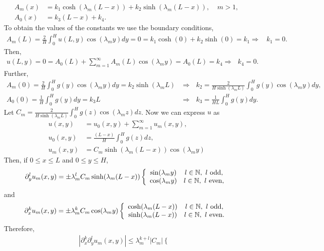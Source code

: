 \begin{questions}
\begin{solution}
\begin{align*}
A_m(x)&=k_1\cosh(\lambda_m(L-x))+k_2\sinh(\lambda_m(L-x)),~~~~~m>1,\\
A_0(x)&=k_3(L-x)+k_4.
\end{align*}
To obtain the values of the constants we use the boundary conditions,
\begin{align*}
A_m(L)=\frac{2}{H}\int_0^Hu(L,y)\cos(\lambda_my)dy=0=k_1\cosh(0)+k_2\sinh(0)=k_1\Rightarrow~~~~\boxed{k_1=0}.
\end{align*}
Then,
\begin{align*}
u(L,y)=0=A_0(L)+\sum_{m=1}^{\infty}A_m(L)\cos(\lambda_my)=A_0(L)=k_4\Rightarrow~~~\boxed{k_4=0}.
\end{align*}
Further,
\begin{align*}
A_m(0)=\frac{2}{H}\int_0^Hg(y)\cos(\lambda_my)dy=k_2\sinh(\lambda_mL)&\Rightarrow~~~\boxed{k_2=\frac{2}{H\sinh(\lambda_mL)}\int_0^Hg(y)\cos(\lambda_my)dy},\\
A_0(0)=\frac{1}{H}\int_0^Hg(y)dy=k_3L&\Rightarrow~~~\boxed{k_3=\frac{1}{HL}\int_0^Hg(y)dy}.
\end{align*}
Let $C_m=\frac{2}{H\sinh(\lambda_mL)}\int_0^Hg(z)\cos(\lambda_mz)dz$. Now we can express $u$ as
\begin{align*}
u(x,y)&=u_0(x,y)+\sum_{m=1}^{\infty}u_m(x,y),\\
u_0(x,y)&=\frac{(L-x)}{H}\int_0^Hg(z)dz,\\
u_m(x,y)&=C_m\sinh(\lambda_m(L-x))\cos(\lambda_my)
\end{align*}
Then, if $0\leq x\leq L$ and $0\leq y\leq H$,
\begin{align*}
\partial_y^lu_m(x,y)=\pm\lambda_m^lC_m\sinh(\lambda_m(L-x))\left\{ \begin{array}{cc} 
                \sin(\lambda_my) & l\in\mathbb{N},~l~\text{odd}, \\
                \cos(\lambda_my) & l\in\mathbb{N},~l~\text{even},
                \end{array} \right.
\end{align*}
and
\begin{align*}
\partial_x^ku_m(x,y)=\pm\lambda_m^kC_m\cos(\lambda_my)\left\{ \begin{array}{cc} 
                \cosh(\lambda_m(L-x)) & l\in\mathbb{N},~l~\text{odd}, \\
                \sinh(\lambda_m(L-x)) & l\in\mathbb{N},~l~\text{even}.
                \end{array} \right.
\end{align*}
Therefore,
\begin{align*}
\left|\partial_x^k\partial_y^lu_m(x,y)\right|\leq \lambda_m^{k+l}|C_m|\left\{ \begin{array}{cc} 

\end{array}
\end{align*}
\end{solution}
\end{questions}
